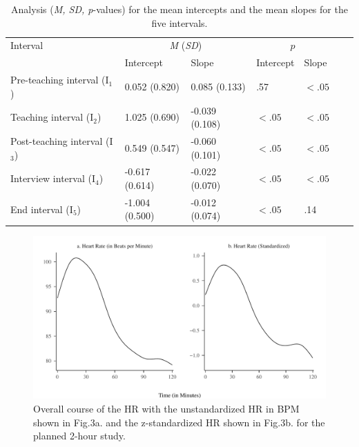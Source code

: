 \documentclass[preprint,
3p]{elsarticle} %
\begin{document}
\renewcommand{\arraystretch}{1.5} 

\begin{table}[ht]
    \centering
    \begin{tabularx}{\textwidth}{lXXXXXX}
        \toprule
        Interval  & \multicolumn{2}{c}{\textit{M} (\textit{SD})} & \multicolumn{2}{c}{$p$} \\ & Intercept & Slope & Intercept & Slope \\
        \midrule
        Pre-teaching interval (I$_1$) & 0.052 (0.820) & 0.085 (0.133) & .57 & $< .05$ \\
        Teaching interval (I$_2$) & 1.025 (0.690) & -0.039 (0.108) & $< .05$ & $< .05$ \\
        Post-teaching interval (I$_3$) & 0.549 (0.547) & -0.060 (0.101) & $< .05$ & $< .05$ \\
        Interview interval (I$_4$) & -0.617 (0.614) & -0.022 (0.070) & $< .05$ & $< .05$ \\
        End interval (I$_5$) & -1.004 (0.500) & -0.012 (0.074) & $< .05$ & .14 \\
        \bottomrule
    \end{tabularx}
    \caption{Analysis (\textit{M, SD, p}-values) for the mean intercepts and the mean slopes for the five intervals.}
    \label{tab_2}
\end{table}

\begin{figure}[H]
  \centering
  \includegraphics[width=1\textwidth]{plots_publication/loess_plot_std_unstd_new.pdf}
  \caption{Overall course of the HR with the unstandardized HR in BPM shown in Fig.3a. and the z-standardized HR shown in Fig.3b. for the planned 2-hour study.}
  \label{fig.3}
\end{figure}
\end{document}
